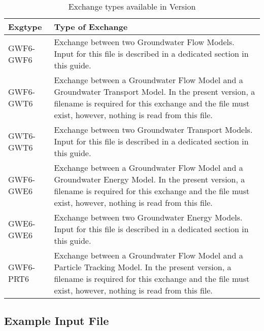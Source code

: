 \begin{table}[h]
\caption{Exchange types available in Version \modflowversion}
\small
\begin{center}
\begin{tabular*}{\columnwidth}{l p{13cm}}
\hline
\hline
Exgtype & Type of Exchange \\
\hline
GWF6-GWF6 & Exchange between two Groundwater Flow Models.  Input for this file is described in a dedicated section in this guide. \\
GWF6-GWT6 & Exchange between a Groundwater Flow Model and a Groundwater Transport Model.  In the present version, a filename is required for this exchange and the file must exist, however, nothing is read from this file.  \\
GWT6-GWT6 & Exchange between two Groundwater Transport Models.  Input for this file is described in a dedicated section in this guide. \\
GWF6-GWE6 & Exchange between a Groundwater Flow Model and a Groundwater Energy Model.  In the present version, a filename is required for this exchange and the file must exist, however, nothing is read from this file.  \\
GWE6-GWE6 & Exchange between two Groundwater Energy Models.  Input for this file is described in a dedicated section in this guide. \\
GWF6-PRT6 & Exchange between a Groundwater Flow Model and a Particle Tracking Model.  In the present version, a filename is required for this exchange and the file must exist, however, nothing is read from this file.  \\
\hline
\end{tabular*}
\label{table:exgtype}
\end{center}
\normalsize
\end{table}

\vspace{5mm}
\subsection{Example Input File}


